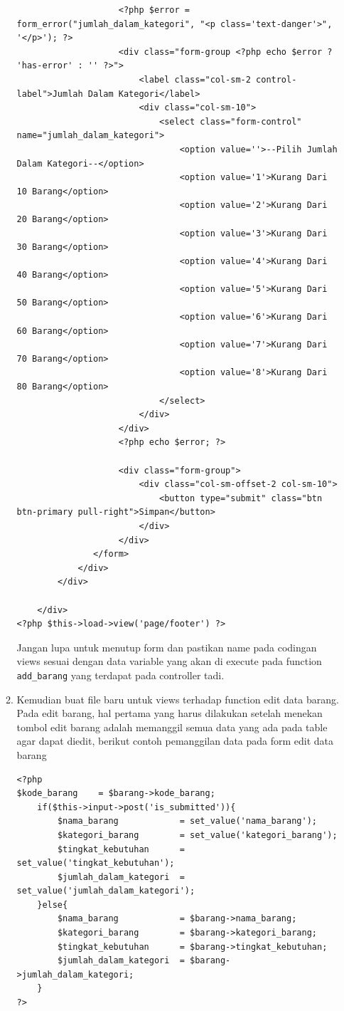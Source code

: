 \begin{enumerate}
\begin{enumerate}
\begin{lstlisting}
                    <?php $error = form_error("jumlah_dalam_kategori", "<p class='text-danger'>", '</p>'); ?>
                    <div class="form-group <?php echo $error ? 'has-error' : '' ?>">
                        <label class="col-sm-2 control-label">Jumlah Dalam Kategori</label>
                        <div class="col-sm-10">
                            <select class="form-control" name="jumlah_dalam_kategori">
                                <option value=''>--Pilih Jumlah Dalam Kategori--</option>
                                <option value='1'>Kurang Dari 10 Barang</option>
                                <option value='2'>Kurang Dari 20 Barang</option>
                                <option value='3'>Kurang Dari 30 Barang</option>
                                <option value='4'>Kurang Dari 40 Barang</option>
                                <option value='5'>Kurang Dari 50 Barang</option>
                                <option value='6'>Kurang Dari 60 Barang</option>
                                <option value='7'>Kurang Dari 70 Barang</option>
                                <option value='8'>Kurang Dari 80 Barang</option>
                            </select>
                        </div>
                    </div>
                    <?php echo $error; ?>

                    <div class="form-group">
                        <div class="col-sm-offset-2 col-sm-10">
                            <button type="submit" class="btn btn-primary pull-right">Simpan</button>
                        </div>
                    </div>
               </form>
            </div>
        </div>
        
    </div>
<?php $this->load->view('page/footer') ?>

\end{lstlisting}
    		\par Jangan lupa untuk menutup form dan pastikan name pada codingan views sesuai dengan data variable yang akan di execute pada function \verb|add_barang| yang terdapat pada controller tadi.
    		
    	\item Kemudian buat file baru untuk views terhadap function edit data barang. Pada edit barang, hal pertama yang harus dilakukan setelah menekan tombol edit barang adalah memanggil semua data yang ada pada table agar dapat diedit, berikut contoh pemanggilan data pada form edit data barang
\begin{lstlisting}
<?php
$kode_barang    = $barang->kode_barang;
    if($this->input->post('is_submitted')){
        $nama_barang            = set_value('nama_barang');
        $kategori_barang        = set_value('kategori_barang');
        $tingkat_kebutuhan      = set_value('tingkat_kebutuhan');
        $jumlah_dalam_kategori  = set_value('jumlah_dalam_kategori');
    }else{
        $nama_barang            = $barang->nama_barang;
        $kategori_barang        = $barang->kategori_barang;
        $tingkat_kebutuhan      = $barang->tingkat_kebutuhan;
        $jumlah_dalam_kategori  = $barang->jumlah_dalam_kategori;
    }
?>
\end{lstlisting}
    		

\end{enumerate}
\end{enumerate}
